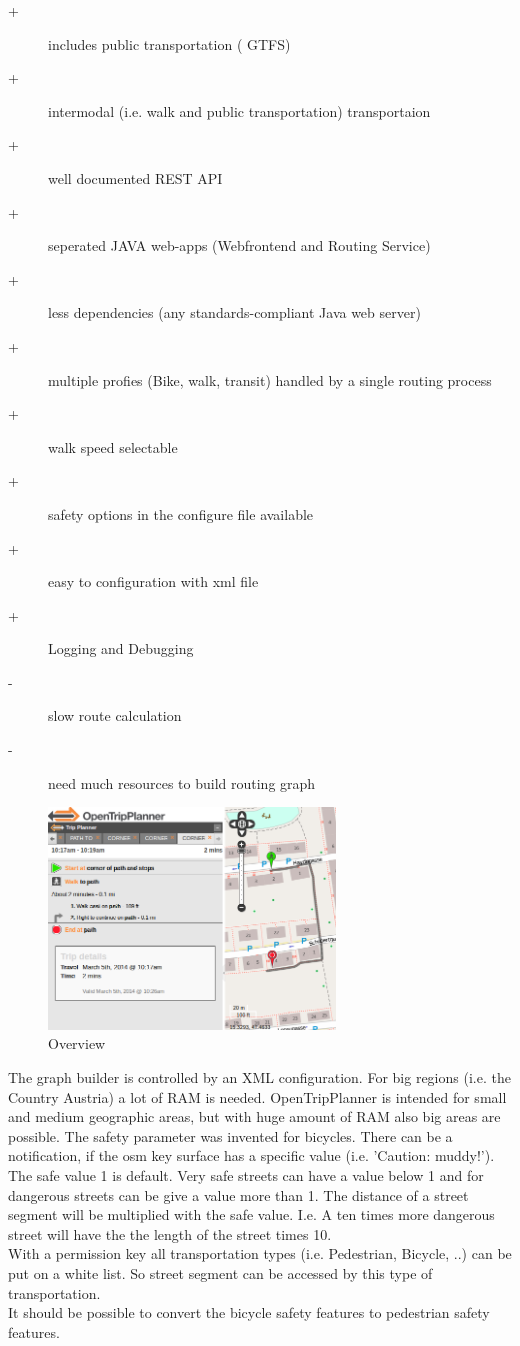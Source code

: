 \documentclass{sig-alternate}
\begin{document}
\begin{description}
  \item[+] includes public transportation ( GTFS)
  \item[+] intermodal (i.e. walk and public transportation) transportaion
  \item[+] well documented REST API
  \item[+] seperated JAVA web-apps (Webfrontend and Routing Service)
  \item[+] less dependencies (any standards-compliant Java web server)
  \item[+] multiple profies (Bike, walk, transit) handled by a single routing process
  \item[+] walk speed selectable
  \item[+] safety options in the configure file available
  \item[+] easy to configuration with xml file
  \item[+] Logging and Debugging 
  \item[-] slow route calculation
  \item[-] need much resources to build routing graph   
\end{description} 
 
\begin{figure}
\centering
\includegraphics[width=3in]{otp-ss.png}
\caption{Overview}
\end{figure}
 
 The graph builder is controlled by an XML configuration. For big regions (i.e. the Country Austria) a lot of RAM is needed. OpenTripPlanner is intended for small and medium geographic areas, but with huge amount of RAM also big areas are possible. The safety parameter was invented for bicycles. There can be a notification, if the osm key surface  has a specific value (i.e. 'Caution: muddy!'). The safe value 1 is default. Very safe streets can have a value below 1 and for dangerous streets can be give a value more than 1. The distance of a street segment will be multiplied with the safe value. I.e. A ten times more dangerous street will have the the length of the street times 10. \\
 With a permission key all transportation types (i.e. Pedestrian, Bicycle, ..) can be put on a white list. So street segment can be accessed by this type of transportation. \\
 It should be possible to convert the bicycle safety features to pedestrian safety features.
 
\end{document}
